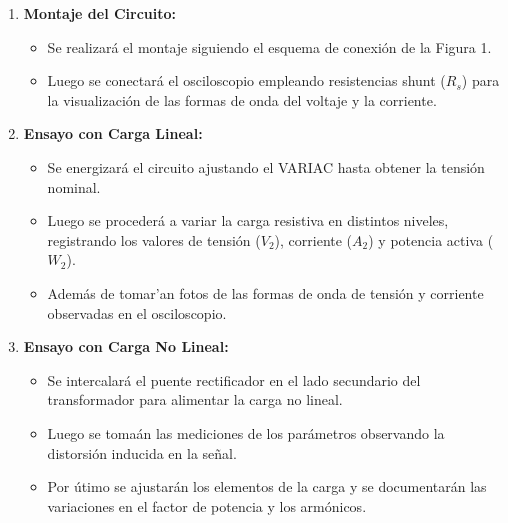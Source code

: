 \documentclass[12pt]{article}
\begin{document}
\begin{enumerate}
    \item \textbf{Montaje del Circuito:}
    \begin{itemize}
        \item Se realizar\'a el montaje siguiendo el esquema de conexi\'on de la Figura 1. 
        \item Luego se conectar\'a el osciloscopio empleando resistencias shunt ($R_s$) para la visualizaci\'on de las formas de onda del voltaje y la corriente.
    \end{itemize}

    \item \textbf{Ensayo con Carga Lineal:}
    \begin{itemize}
        \item Se energizar\'a el circuito ajustando el VARIAC hasta obtener la tensi\'on nominal.
        \item Luego se proceder\'a a variar la carga resistiva en distintos niveles, registrando los valores de tensi\'on ($V_2$), corriente ($A_2$) y potencia activa ($W_2$).
        \item Adem\'as de tomar'an fotos de las formas de onda de tensi\'on y corriente observadas en el osciloscopio.
    \end{itemize}

    \item \textbf{Ensayo con Carga No Lineal:}
    \begin{itemize}
        \item Se intercalar\'a el puente rectificador en el lado secundario del transformador para alimentar la carga no lineal.
        \item Luego se toma\'an las mediciones de los par\'ametros observando la distorsi\'on inducida en la se\~nal.
        \item Por \'utimo se ajustar\'an los elementos de la carga y se documentar\'an las variaciones en el factor de potencia y los arm\'onicos.
    \end{itemize}
\end{enumerate}
\end{document}
